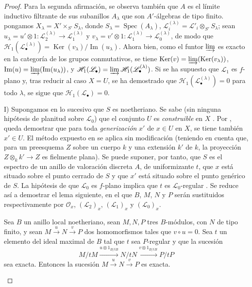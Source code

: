 \begin{proof}
Para la segunda afirmación, se observa también que $A$ es el límite inductivo filtrante de sus subanillos $A_\lambda$ que son $A'$-álgebras de tipo finito.
pongamos $X_\lambda=X'\times_{S'}S_\lambda$, donde
$S_\lambda=\operatorname{Spec}(A_\lambda)$,
$\mathcal L_i^{(\lambda)}=\mathcal L'_i\otimes_{S'}S_\lambda$; sean
$u_\lambda=u'\otimes1:\mathcal L_2^{(\lambda)}\to\mathcal L_1^{(\lambda)}$ y
$v_\lambda=v'\otimes1:\mathcal L_1^{(\lambda)}\to\mathcal L_0^{(\lambda)}$, de modo que
$\mathcal H_1(\mathcal L_\bullet^{(\lambda)})
=\operatorname{Ker}(v_\lambda)/\operatorname{Im}(u_\lambda)$.
Ahora bien, como el funtor $\varinjlim$ es exacto en la categoría de los grupos conmutativos, se tiene
$\operatorname{Ker}(v)=\varinjlim(\operatorname{Ker}(v_\lambda))$,
$\operatorname{Im}(u)=\varinjlim(\operatorname{Im}(u_\lambda))$, y
$\mathcal H_1(\mathcal L_\bullet)
=\varinjlim\mathcal H_1(\mathcal L_\bullet^{(\lambda)})$.
Si se ha supuesto que $\mathcal L_1$ es $f$-plano y, tras reducir al caso $X=U$, se ha demostrado que
$\mathcal H_1(\mathcal L_\bullet^{(\lambda)})=0$ para todo $\lambda$, se sigue que
$\mathcal H_1(\mathcal L_\bullet)=0$.

\medskip
I) Supongamos en lo sucesivo que $S$ es noetheriano.
Se sabe (sin ninguna hipótesis de planitud sobre $\mathcal L_0$) que el conjunto $U$ es \emph{construible} en $X$ .
Por , queda demostrar que para toda \emph{generización} $x'$ de $x\in U$ en $X$, se tiene también $x'\in U$.
El método expuesto en  se aplica sin modificación (teniendo en cuenta que, para un preesquema $Z$ sobre un cuerpo $k$ y una extensión $k'$ de $k$, la proyección $Z\otimes_k k'\to Z$ es fielmente plana).
Se puede suponer, por tanto, que $S$ es el espectro de un anillo de valoración discreta $A$, de uniformizante $t$, que $x$ está situado sobre el punto cerrado de $S$ y que $x'$ está situado sobre el punto genérico de $S$.
La hipótesis de que $\mathcal L_0$ es $f$-plano implica que $t$ es $\mathcal L_0$-regular .
Se reduce así a demostrar el lema siguiente, en el que $B$, $M$, $N$ y $P$ serán sustituidos respectivamente por $\mathcal O_x$, $(\mathcal L_2)_x$, $(\mathcal L_1)_x$ y $(\mathcal L_0)_x$.

\begin{lemma}[12.3.3.1]
\label{IV.12.3.3.1}
Sea $B$ un anillo local noetheriano, sean $M,N,P$ tres $B$-módulos, con $N$ de tipo finito, y sean
$M\xrightarrow{u}N\xrightarrow{v}P$ dos homomorfismos tales que $v\circ u=0$.
Sea $t$ un elemento del ideal maximal de $B$ tal que $t$ sea $P$-regular y que la sucesión
\begin{equation}
  \tag{12.3.3.2}
  \label{IV.12.3.3.2-fr}
  M/tM\xrightarrow{u\otimes1_{B/tB}}N/tN
  \xrightarrow{v\otimes1_{B/tB}}P/tP
\end{equation}
sea exacta. Entonces la sucesión $M\xrightarrow{u}N\xrightarrow{v}P$ es exacta.
\end{lemma}


\end{proof}
